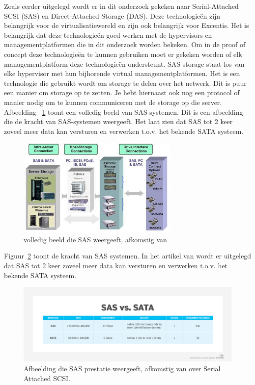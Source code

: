 Zoals eerder uitgelegd wordt er in dit onderzoek gekeken naar Serial-Attached SCSI (SAS) en Direct-Attached Storage (DAS). Deze technologieën zijn belangrijk voor de virtualisatiewereld en zijn ook belangrijk voor Excentis. Het is belangrijk dat deze technologieën goed werken met de hypervisors en managementplatformen die in dit onderzoek worden bekeken.
Om in de proof of concept deze technologieën te kunnen gebruiken moet er gekeken worden of elk managementplatform deze technologieën ondersteunt.
SAS-storage staat los van elke hypervisor met hun bijhorende virtual managementplatformen. Het is een technologie die gebruikt wordt om storage te delen over het netwerk. Dit is puur een manier om storage op te zetten. Je hebt hiernaast ook nog een protocol of manier nodig om te kunnen communiceren met de storage op die server.
Afbeelding ~\ref{fig:sas} toont een volledig beeld van SAS-systemen. Dit is een afbeelding die de kracht van SAS-systemen weergeeft. Het laat zien dat SAS tot 2 keer zoveel meer data kan versturen en verwerken t.o.v. het bekende SATA systeem.
\begin{figure}[h!]
    \centering
    \includegraphics[width=0.7\textwidth]{../onderzoek/storagesas-das.jpg} 
    \caption{volledig beeld die SAS weergeeft, afkomstig van \textcite{eetimesSAS}}
    \label{fig:sas}
\end{figure}

\FloatBarrier
Figuur~\ref{fig:saspres} toont de kracht van SAS systemen. In het artikel van \textcite{loshin2022sas} wordt er uitgelegd dat SAS tot 2 keer zoveel meer data kan versturen en verwerken t.o.v. het bekende SATA systeem.

\begin{figure}[h!]
    \centering
    \includegraphics[width=1.0\textwidth]{../onderzoek/sas_vs_sata-f.png} 
    \caption{Afbeelding die SAS prestatie weergeeft, afkomstig van \textcite{loshinKranzSAS} over Serial Attached SCSI.}
    \label{fig:saspres}
\end{figure}


